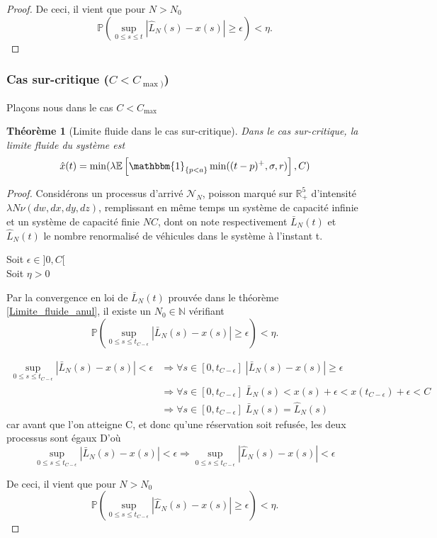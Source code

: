 \documentclass[12pt,a4paper]{article}
\newcommand{\E}[1]{\mathbb{E}\left[ #1 \right]}
\newcommand{\R}{\mathbb{R}}
\newcommand{\1}[1]{\mathbbm{1}_{\{#1\}} }
\newtheorem{theorem}{Théorème}
\theoremstyle{definition}
\begin{document}
{\begin{proof}
De ceci, il vient que pour $N>N_0$ $$\mathbb{P}\left(\underset{0\leq s \leq t}{\sup} |\hat{L}_N(s) - x(s)| \geq \epsilon \right) < \eta.$$
\end{proof}

\subsubsection{Cas sur-critique ($C<C_{\max)}$)}
Plaçons nous dans le cas $C<C_{\max}$
\begin{theorem}[Limite fluide dans le cas sur-critique]
Dans le cas sur-critique, la limite fluide du système est $$\hat{x}(t) = \min(\lambda\E{\1{p<a}\min((t-p)^+,\sigma,r)},C)$$ 
\end{theorem}
\begin{proof}

Considérons un processus d'arrivé $\mathcal{N}_N$, poisson marqué sur $\R_+^5$ d'intensité $\lambda N \nu(dw,dx,dy,dz)$, remplissant en même temps un système de capacité infinie et un système de capacité finie $NC$, dont on note respectivement $\bar{L}_N(t)$ et $\hat{L}_N(t)$ le nombre renormalisé de véhicules dans le système à l'instant t.

Soit $\epsilon \in ]0,C[$\\
Soit $\eta >0$


Par la convergence en loi de $\bar{L}_N(t)$ prouvée dans le théorème  \ref{Limite_fluide_anul}, il existe un $N_0\in \mathbb{N}$ vérifiant
$$\mathbb{P}\left(\underset{0\leq s \leq t_{C-\epsilon}}{\sup} |\bar{L}_N(s) - x(s)| \geq \epsilon \right) < \eta.$$

\begin{align*}
\underset{0\leq s  \leq t_{C-\epsilon}}{\sup} |\bar{L}_N(s) - x(s)| < \epsilon & \Rightarrow \forall s \in [0,t_{C-\epsilon}]\; |\bar{L}_N(s) - x(s)| \geq \epsilon\\
& \Rightarrow \forall s \in [0,t_{C-\epsilon}] \;\bar{L}_N(s) < x(s) + \epsilon  < x(t_{C-\epsilon}) + \epsilon < C\\
&\Rightarrow \forall s \in [0,t_{C-\epsilon}]\;\bar{L}_N(s) = \hat{L}_N(s)
\end{align*}
car avant que l'on atteigne C, et donc qu'une réservation soit refusée, les deux processus sont égaux
D'où $$\underset{0\leq s \leq t_{C-\epsilon}}{\sup} |\bar{L}_N(s) - x(s)| < \epsilon  \Rightarrow \underset{0\leq s \leq t_{C-\epsilon}}{\sup} |\hat{L}_N(s) - x(s)| < \epsilon $$


De ceci, il vient que pour $N>N_0$ $$\mathbb{P}\left(\underset{0\leq s \leq t_{C-\epsilon}}{\sup} |\hat{L}_N(s) - x(s)| \geq \epsilon \right) < \eta.$$


\end{proof}}
\end{document}
